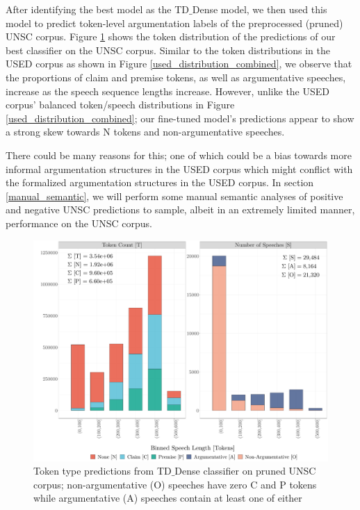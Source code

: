 After identifying the best model as the TD$\_$Dense model, we then used this model to predict token-level argumentation labels of the preprocessed (pruned) UNSC corpus. Figure \ref{unsc_pred} shows the token distribution of the predictions of our best classifier on the UNSC corpus. Similar to the token distributions in the USED corpus as shown in Figure \ref{used_distribution_combined}, we observe that the proportions of claim and premise tokens, as well as argumentative speeches, increase as the speech sequence lengths increase. However, unlike the USED corpus' balanced token/speech distributions in Figure \ref{used_distribution_combined}; our fine-tuned model's predictions appear to show a strong skew towards N tokens and non-argumentative speeches.

There could be many reasons for this; one of which could be a bias towards more informal argumentation structures in the USED corpus which might conflict with the formalized argumentation structures in the USED corpus. In section \ref{manual_semantic}, we will perform some manual semantic analyses of positive and negative UNSC predictions to sample, albeit in an extremely limited manner, performance on the UNSC corpus. 

\begin{figure}[t!]
    \centering
    \includegraphics[trim={1.0cm 0cm 0cm
    0cm},clip,width=\textwidth]{img/token_dist_pred_UNSC_length.pdf}
    \caption{Token type predictions from TD$\_$Dense classifier on pruned UNSC corpus; non-argumentative (O) speeches have zero C and P tokens while argumentative (A) speeches contain at least one of either}
    \label{unsc_pred}
\end{figure}